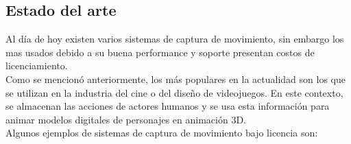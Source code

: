 \subsection{Estado del arte}

Al día de hoy existen varios sistemas de captura de movimiento, sin embargo los mas usados debido a su buena performance y soporte presentan costos de licenciamiento. 
\\ 

Como se mencionó anteriormente, los más populares en la actualidad son los que se utilizan en la industria del cine o del diseño de videojuegos. En este contexto, se almacenan las acciones de actores humanos y se usa esta información para animar modelos digitales de personajes en animación 3D.
\\ 

Algunos ejemplos de sistemas de captura de movimiento bajo licencia son:

